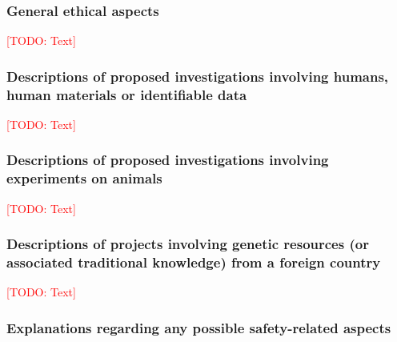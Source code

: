 \documentclass[american,firsttime]{dfgproposal}
\newcommand{\todo}[1]{\xspace{\textcolor{red}{[TODO: #1]}}\xspace}
\begin{document}
	\subsubsection{General ethical aspects}
	\todo{Text}
	
	\subsubsection{Descriptions of proposed investigations involving humans, human materials or identifiable data}
	\todo{Text}
	
	\subsubsection{Descriptions of proposed investigations involving experiments on animals}
	\todo{Text}
	
	\subsubsection{Descriptions of projects involving genetic resources (or associated traditional knowledge) from a foreign country}
	\todo{Text}
	
	\subsubsection{Explanations regarding any possible safety-related aspects}
	
\end{document}
